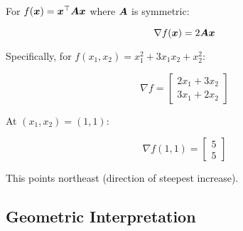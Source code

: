 \begin{example}
For $f(\bm{x}) = \bm{x}^\top \bm{A} \bm{x}$ where $\bm{A}$ is symmetric:

\begin{equation}
    \nabla f(\bm{x}) = 2\bm{A}\bm{x}
\end{equation}

Specifically, for $f(x_1, x_2) = x_1^2 + 3x_1 x_2 + x_2^2$:

\begin{equation}
    \nabla f = \begin{bmatrix} 2x_1 + 3x_2 \\ 3x_1 + 2x_2 \end{bmatrix}
\end{equation}

At $(x_1, x_2) = (1, 1)$:

\begin{equation}
    \nabla f(1, 1) = \begin{bmatrix} 5 \\ 5 \end{bmatrix}
\end{equation}

This points northeast (direction of steepest increase).
\end{example}

\subsection{Geometric Interpretation}

